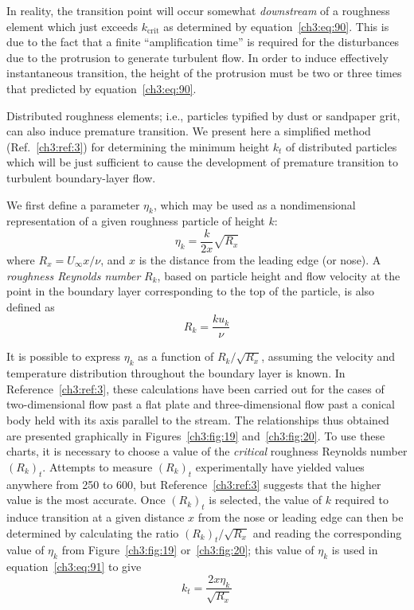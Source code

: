 In reality, the transition point will occur somewhat
\emph{downstream} of a roughness element which just exceeds $k_{\mathrm{crit}}$
as determined by equation~\eqref{ch3:eq:90}. This is due to the fact that
a finite ``amplification time'' is required for the disturbances
due to the protrusion to generate turbulent flow. In order to
induce effectively instantaneous transition, the height of the
protrusion must be two or three times that predicted by
equation~\eqref{ch3:eq:90}.

Distributed roughness elements; i.e., particles typified
by dust or sandpaper grit, can also induce premature transition.
We present here a simplified method (Ref.~\ref{ch3:ref:3}) for determining
the minimum height $k_t$ of distributed particles which will be
just sufficient to cause the development of premature transition
to turbulent boundary-layer flow.

We first define a parameter $\eta_k$, which may be used as a
nondimensional representation of a given roughness particle of
height $k$:
\begin{equation}\label{ch3:eq:91}
\eta_k = \frac{k}{2x}\sqrt{R_x}
\end{equation}
where $R_x = U_\infty x/\nu$, and $x$ is the distance from the leading edge
(or nose). A \emph{roughness Reynolds number} $R_k$, based on particle
height and flow velocity at the point in the boundary layer
corresponding to the top of the particle, is also defined as
\begin{equation}\label{ch3:eq:92}
R_k = \frac{ku_k}{\nu}
\end{equation}

It is possible to express $\eta_k$ as a function of $R_k/\sqrt{R_x}$,
assuming the velocity and temperature distribution throughout
the boundary layer is known. In Reference~\ref{ch3:ref:3}, these calculations
have been carried out for the cases of two-dimensional flow
past a flat plate and three-dimensional flow past a conical
body held with its axis parallel to the stream. The relationships
thus obtained are presented graphically in Figures~\ref{ch3:fig:19} and~\ref{ch3:fig:20}.
To use these charts, it is necessary to choose a value of the
\emph{critical} roughness Reynolds number $(R_k)_t$. Attempts to measure
$(R_k)_t$ experimentally have yielded values anywhere from 250 to
600, but Reference~\ref{ch3:ref:3} suggests that the higher value is the most
accurate. Once $(R_k)_t$ is selected, the value of $k$ required to
induce transition at a given distance $x$ from the nose or leading
edge can then be determined by calculating the ratio $(R_k)_t/\sqrt{R_x}$
and reading the corresponding value of $\eta_k$ from Figure~\ref{ch3:fig:19}
or~\ref{ch3:fig:20}; this value of $\eta_k$ is used in equation~\eqref{ch3:eq:91} to give
\begin{equation}\label{ch3:eq:93}
k_t = \frac{2x\eta_k}{\sqrt{R_x}}
\end{equation}

